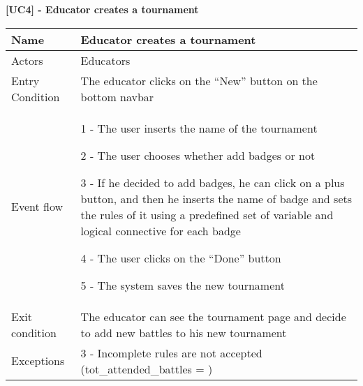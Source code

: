     \begin{table}[]
    
    \textbf{[UC4] - Educator creates a tournament}
    
      \centering
      \begin{tabular}{|p{3cm}|p{14cm}|}
        \hline
         Name & Educator creates a tournament \\
        \hline
        Actors & Educators \\
        \hline
        Entry Condition & The educator clicks on the ``New'' button on the bottom navbar \\
        \hline
        Event flow &  1 - The user inserts the name of the tournament
        
        2 - The user chooses whether add badges or not

        3 - If he decided to add badges, he can click on a plus button, and then he inserts the name of badge and sets the rules of it using a predefined set of variable and logical connective for each badge

        4 - The user clicks on the ``Done'' button

        5 - The system saves the new tournament
        \\
        \hline
        Exit condition & The educator can see the tournament page and decide to add new battles to his new tournament \\
        \hline
        Exceptions &
        3 - Incomplete rules are not accepted (tot\_attended\_battles = )
        \\
        \hline
        
      \end{tabular}
      
    \end{table}

